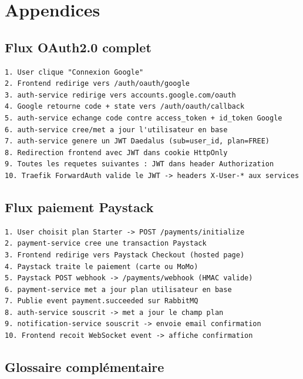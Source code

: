 \documentclass[12pt,a4paper]{article}
\begin{document}
\section{Appendices}

\subsection{Flux OAuth2.0 complet}

\begin{lstlisting}[language={}]
1. User clique "Connexion Google"
2. Frontend redirige vers /auth/oauth/google
3. auth-service redirige vers accounts.google.com/oauth
4. Google retourne code + state vers /auth/oauth/callback
5. auth-service echange code contre access_token + id_token Google
6. auth-service cree/met a jour l'utilisateur en base
7. auth-service genere un JWT Daedalus (sub=user_id, plan=FREE)
8. Redirection frontend avec JWT dans cookie HttpOnly
9. Toutes les requetes suivantes : JWT dans header Authorization
10. Traefik ForwardAuth valide le JWT -> headers X-User-* aux services
\end{lstlisting}

\subsection{Flux paiement Paystack}

\begin{lstlisting}[language={}]
1. User choisit plan Starter -> POST /payments/initialize
2. payment-service cree une transaction Paystack
3. Frontend redirige vers Paystack Checkout (hosted page)
4. Paystack traite le paiement (carte ou MoMo)
5. Paystack POST webhook -> /payments/webhook (HMAC valide)
6. payment-service met a jour plan utilisateur en base
7. Publie event payment.succeeded sur RabbitMQ
8. auth-service souscrit -> met a jour le champ plan
9. notification-service souscrit -> envoie email confirmation
10. Frontend recoit WebSocket event -> affiche confirmation
\end{lstlisting}

\subsection{Glossaire complémentaire}
\end{document}
